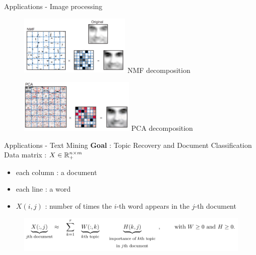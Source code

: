 \begin{frame}{Applications - Image processing}
    \begin{figure}[h!]
        \centering
        \begin{minipage}{0.45\textwidth}
            \centering
            \includegraphics[width=5.3cm]{../images/NMFcomp.png}
            NMF decomposition
        \end{minipage}
        \hfill
        \begin{minipage}{0.45\textwidth}
            \centering
            \includegraphics[width=5.5cm]{../images/PCAcomp.png}
            PCA decomposition
        \end{minipage}
    \end{figure}
\end{frame}
\begin{frame}{Applications - Text Mining}
    \textbf{Goal} : Topic Recovery and Document Classification\\
    \vspace{0.7cm}
    Data matrix : $X\in\mathbb{R}^{n\times m}_+$\\
    \begin{itemize}
        \item each column : a document
        \item each line : a word
        \item $X(i,j)$ : number of times the $i$-th word appears in the $j$-th document
    \end{itemize}
    \begin{figure}
        \centering
        \includegraphics[width=0.9\linewidth]{../images/NMF_app2.png}
    \end{figure}
\end{frame}
